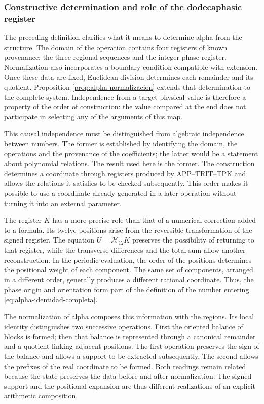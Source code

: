 \subsubsection{Constructive determination and role of the dodecaphasic register}
\label{alpha-ampl-dependencias}

The preceding definition clarifies what it means to determine alpha from
the structure. The domain of the operation contains four registers of
known provenance: the three regional sequences and the integer phase
register. Normalization also incorporates a boundary condition
compatible with extension. Once these data are fixed, Euclidean
division determines each remainder and its quotient. Proposition
\ref{prop:alpha-normalizacion} extends that determination to the complete
system. Independence from a target physical value is therefore
a property of the order of construction: the value compared at the
end does not participate in selecting any of the arguments of this
map.

This causal independence must be distinguished from algebraic independence
between numbers. The former is established by identifying the domain, the
operations and the provenance of the coefficients; the latter would be a
statement about polynomial relations. The result used here is the
former. The construction determines a coordinate through registers
produced by APP--TRIT--TPK and allows the relations it satisfies to be
checked subsequently. This order makes it possible to use a coordinate already
generated in a later operation without turning it into an external parameter.

The register $K$ has a more precise role than that of a numerical
correction added to a formula. Its twelve positions arise from the
reversible transformation of the signed register. The equation
$U=\mathcal H_{12}K$ preserves the possibility of returning to that register,
while the transverse differences and the total sum allow another
reconstruction. In the periodic evaluation, the order of the positions
determines the positional weight of each component. The same set of
components, arranged in a different order, generally produces a different rational
coordinate. Thus, the phase origin and orientation form part of the
definition of the number entering \eqref{eq:alpha-identidad-completa}.

The normalization of alpha composes this information with the regions. Its
local identity distinguishes two successive operations. First the oriented
balance of blocks is formed; then that balance is represented through
a canonical remainder and a quotient linking adjacent positions. The first
operation preserves the sign of the balance and allows a support to be
extracted subsequently. The second allows the prefixes of the real
coordinate to be formed. Both readings remain related because the state preserves the
data before and after normalization. The signed support and the
positional expansion are thus different realizations of an explicit
arithmetic composition.

